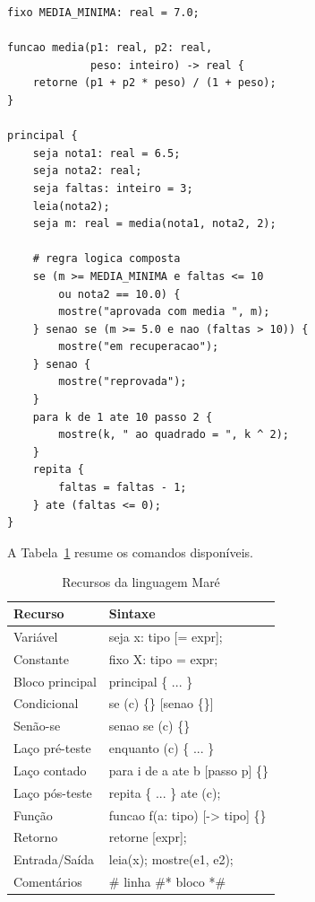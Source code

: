 \documentclass[conference]{IEEEtran}
\begin{document}
\begin{lstlisting}[language=Mare,caption={Trecho do programa de demonstração \texttt{completo.mare}.},label=lst:exemplo]
fixo MEDIA_MINIMA: real = 7.0;

funcao media(p1: real, p2: real,
             peso: inteiro) -> real {
    retorne (p1 + p2 * peso) / (1 + peso);
}

principal {
    seja nota1: real = 6.5;
    seja nota2: real;
    seja faltas: inteiro = 3;
    leia(nota2);
    seja m: real = media(nota1, nota2, 2);

    # regra logica composta
    se (m >= MEDIA_MINIMA e faltas <= 10
        ou nota2 == 10.0) {
        mostre("aprovada com media ", m);
    } senao se (m >= 5.0 e nao (faltas > 10)) {
        mostre("em recuperacao");
    } senao {
        mostre("reprovada");
    }
    para k de 1 ate 10 passo 2 {
        mostre(k, " ao quadrado = ", k ^ 2);
    }
    repita {
        faltas = faltas - 1;
    } ate (faltas <= 0);
}
\end{lstlisting}

A Tabela~\ref{tab:recursos} resume os comandos disponíveis.

\begin{table}[!t]
\caption{Recursos da linguagem Maré}\label{tab:recursos}
\centering\footnotesize
\begin{tabular}{@{}l>{\ttfamily}l@{}}
\toprule
\textbf{Recurso} & \normalfont\textbf{Sintaxe} \\
\midrule
Variável        & seja x: tipo [= expr]; \\
Constante       & fixo X: tipo = expr; \\
Bloco principal & principal \{ ... \} \\
Condicional     & se (c) \{\} [senao \{\}] \\ Senão-se & senao se (c) \{\} \\
Laço pré-teste  & enquanto (c) \{ ... \} \\
Laço contado    & para i de a ate b [passo p] \{\} \\
Laço pós-teste  & repita \{ ... \} ate (c); \\
Função          & funcao f(a: tipo) [-> tipo] \{\} \\
Retorno         & retorne [expr]; \\
Entrada/Saída   & leia(x); \quad mostre(e1, e2); \\
Comentários     & \# linha \quad \#* bloco *\# \\
\bottomrule
\end{tabular}
\end{table}
\end{document}
